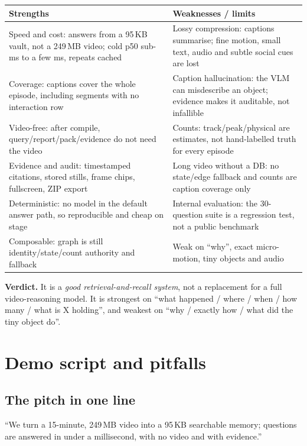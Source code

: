 \documentclass[10pt,a4paper]{article}
\begin{document}
\begin{center}
\small
\begin{tabularx}{\linewidth}{@{}L L@{}}
\toprule
\textbf{Strengths} & \textbf{Weaknesses / limits} \\
\midrule
Speed and cost: answers from a 95\,KB vault, not a 249\,MB video; cold p50 sub-ms to a few ms, repeats cached &
Lossy compression: captions summarise; fine motion, small text, audio and subtle social cues are lost \\
Coverage: captions cover the whole episode, including segments with no interaction row &
Caption hallucination: the VLM can misdescribe an object; evidence makes it auditable, not infallible \\
Video-free: after compile, query/report/pack/evidence do not need the video &
Counts: track/peak/physical are estimates, not hand-labelled truth for every episode \\
Evidence and audit: timestamped citations, stored stills, frame chips, fullscreen, ZIP export &
Long video without a DB: no state/edge fallback and counts are caption coverage only \\
Deterministic: no model in the default answer path, so reproducible and cheap on stage &
Internal evaluation: the 30-question suite is a regression test, not a public benchmark \\
Composable: graph is still identity/state/count authority and fallback &
Weak on ``why'', exact micro-motion, tiny objects and audio \\
\bottomrule
\end{tabularx}
\end{center}

\noindent
\textbf{Verdict.} It is a \emph{good retrieval-and-recall system}, not a replacement for a full
video-reasoning model. It is strongest on ``what happened / where / when / how many / what is X
holding'', and weakest on ``why / exactly how / what did the tiny object do''.

\section{Demo script and pitfalls}

\subsection*{The pitch in one line}

``We turn a 15-minute, 249\,MB video into a 95\,KB searchable memory; questions are answered in
under a millisecond, with no video and with evidence.''
\end{document}
